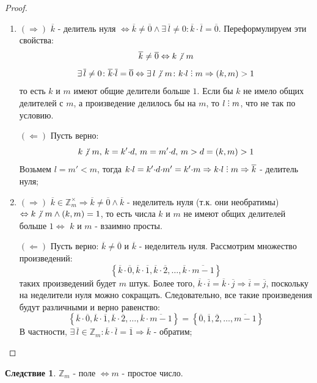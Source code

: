 \documentclass[12pt]{article}
\newcommand{\MZ}{\mathbb{Z}}
\theoremstyle{definition}
\newtheorem{corollary}{Следствие}
\DeclareRobustCommand{\divby}{%
	\mathrel{\text{\vbox{\baselineskip.65ex\lineskiplimit0pt\hbox{.}\hbox{.}\hbox{.}}}}%
}
\DeclareRobustCommand{\ndivby}{\mkern-1mu\not\mathrel{\mkern4.5mu\divby}\mkern1mu}
\newcommand{\ovl}[1]{\overline{#1}}
\begin{document}
\begin{proof}\hfill
	\begin{enumerate}[label=\arabic*)]
		\item $(\Rightarrow)$ $\ovl{k}$ - делитель нуля $\Leftrightarrow \ovl{k} \neq \ovl{0} \wedge \exists\, \ovl{l} \neq 0 \colon \ovl{k}{\cdot}\ovl{l} = \ovl{0}$. Переформулируем эти свойства:
		$$
			\ovl{k} \neq \ovl{0} \Leftrightarrow k \ndivby m
		$$
		$$
			\exists\, \ovl{l} \neq 0 \colon \ovl{k}{\cdot}\ovl{l} = \ovl{0} \Leftrightarrow \exists \, l \ndivby m \colon k{\cdot}l \divby m \Rightarrow (k,m) > 1 
		$$
		то есть $k$ и $m$ имеют общие делители больше $1$. Если бы $k$ не имело общих делителей с $m$, а произведение делилось бы на $m$, то $l \divby m$, что не так по условию. 
		
		$(\Leftarrow)$ Пусть верно:
		$$
			k \ndivby m, \, k = k'{\cdot}d, \, m = m'{\cdot}d, \, m > d = (k,m) > 1
		$$
		Возьмем $l = m' < m$, тогда $k{\cdot}l = k'{\cdot}d{\cdot}m' = k'{\cdot}m \Rightarrow k{\cdot} l \divby m \Rightarrow \ovl{k}$ - делитель нуля;
		\item $(\Rightarrow)$ $\ovl{k} \in \MZ_m^{\times} \Rightarrow \ovl{k} \neq \ovl{0} \wedge \ovl{k}$ - неделитель нуля (т.к. они необратимы) $\Leftrightarrow k \ndivby m \wedge (k,m) = 1$, то есть числа $k$ и $m$ не имеют общих делителей больше $1 \Leftrightarrow$ $k$ и $m$ - взаимно просты. 
		
		$(\Leftarrow)$ Пусть верно: $\ovl{k} \neq \ovl{0}$ и $\ovl{k}$ - неделитель нуля. Рассмотрим множество произведений: 
		$$
			\left\{\ovl{k}{\cdot}\ovl{0},   \ovl{k}{\cdot}\ovl{1},  \ovl{k}{\cdot}\ovl{2}, \dotsc, \ovl{k}{\cdot}\ovl{m-1} \right\}
		$$
		таких произведений будет $m$ штук. Более того, $\ovl{k}{\cdot}\ovl{i} = \ovl{k}{\cdot}\ovl{j} \Rightarrow \ovl{i} = \ovl{j}$, поскольку на неделители нуля можно сокращать. Следовательно, все такие произведения будут различными и верно равенство:
		$$
			\left\{\ovl{k}{\cdot}\ovl{0},   \ovl{k}{\cdot}\ovl{1},  \ovl{k}{\cdot}\ovl{2}, \dotsc, \ovl{k}{\cdot}\ovl{m-1} \right\} = \left\{\ovl{0},\ovl{1},\ovl{2}, \dotsc ,\ovl{m-1}\right\}
		$$
		В частности, $\exists\, \ovl{l} \in \MZ_m \colon \ovl{k}{\cdot}\ovl{l} =\ovl{1} \Rightarrow \ovl{k}$ - обратим;
	\end{enumerate}
\end{proof}

\begin{corollary}
	$\MZ_m$ - поле $\Leftrightarrow m$ - простое число.
\end{corollary}
\end{document}

